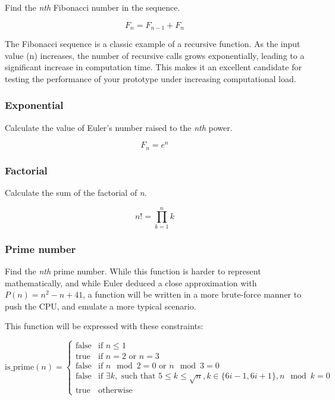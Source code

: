 \documentclass[
  table]{report}
\begin{document}
Find the \emph{nth} Fibonacci number in the sequence.

\[F_n = F_{n-1} + F_n \]

The Fibonacci sequence is a classic example of a recursive function. As
the input value (n) increases, the number of recursive calls grows
exponentially, leading to a significant increase in computation time.
This makes it an excellent candidate for testing the performance of your
prototype under increasing computational load.

\subsubsection*{Exponential}

Calculate the value of Euler's number raised to the \emph{nth} power.

\[F_n = e^n \]

\subsubsection*{Factorial}

Calculate the sum of the factorial of \emph{n}.

\[ n! = \prod_{k=1}^n k \]

\subsubsection*{Prime number}

Find the \emph{nth} prime number. While this function is harder to
represent mathematically, and while Euler deduced a close approximation
with \(P(n) = n^2 - n +
41\), a function will be written in a more brute-force manner to push
the CPU, and emulate a more typical scenario.

This function will be expressed with these constraints:

\[ \text{is\_prime}(n) =
\begin{cases} 
\text{false} & \text{if } n \leq 1 \\
\text{true} & \text{if } n = 2 \text{ or } n = 3 \\
\text{false} & \text{if } n \mod 2 = 0 \text{ or } n \mod 3 = 0 \\
\text{false} & \text{if } \exists k, \text{ such that } 5 \leq k \leq \sqrt{n}, k \in \{6i-1, 6i+1\}, n \mod k = 0 \\
\text{true} & \text{otherwise}
\end{cases}
\]
\end{document}
